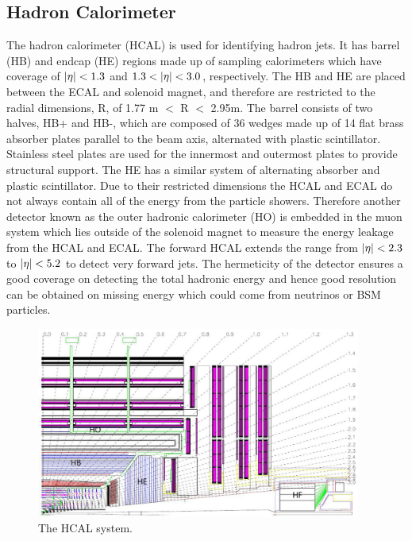 \subsection{Hadron Calorimeter}

The hadron calorimeter (HCAL) is used for identifying hadron jets. It has barrel (HB) and endcap (HE) regions made up of sampling calorimeters which have coverage of $\lvert \eta \rvert<1.3$ and $1.3<\lvert \eta \rvert<3.0$, respectively. The HB and HE are placed between the ECAL and solenoid magnet, and therefore are restricted to the radial dimensions, R, of 1.77 m $<$ R $<$ 2.95m. The barrel consists of two halves, HB+ and HB-, which are composed of 36 wedges made up of 14 flat brass absorber plates parallel to the beam axis, alternated with plastic scintillator. Stainless steel plates are used for the innermost and outermost plates to provide structural support. The HE has a similar system of alternating absorber and plastic scintillator.
Due to their restricted dimensions the HCAL and ECAL do not always contain all of the energy from the particle showers. Therefore another detector known as the outer hadronic calorimeter (HO) is embedded in the muon system which lies outside of the solenoid magnet to measure the energy leakage from the HCAL and ECAL.
The forward HCAL extends the range from $\lvert \eta \rvert<2.3$ to $\lvert \eta \rvert<5.2$ to detect very forward jets. The hermeticity of the detector ensures a good coverage on detecting the total hadronic energy and hence good resolution can be obtained on missing energy which could come from neutrinos or BSM particles.

\begin{figure}[ht!]
\centering
    \includegraphics[width=0.95\textwidth]{images/HCAL.png}
    \caption{The HCAL system.}
    \label{fig:hcal}
\end{figure}

